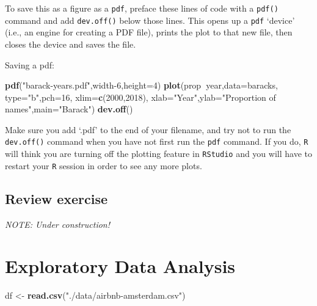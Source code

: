 \documentclass[
]{book}
\newenvironment{Shaded}{\begin{snugshade}}{\end{snugshade}}
\newcommand{\DataTypeTok}[1]{\textcolor[rgb]{0.13,0.29,0.53}{#1}}
\newcommand{\DecValTok}[1]{\textcolor[rgb]{0.00,0.00,0.81}{#1}}
\newcommand{\KeywordTok}[1]{\textcolor[rgb]{0.13,0.29,0.53}{\textbf{#1}}}
\newcommand{\NormalTok}[1]{#1}
\newcommand{\OperatorTok}[1]{\textcolor[rgb]{0.81,0.36,0.00}{\textbf{#1}}}
\newcommand{\StringTok}[1]{\textcolor[rgb]{0.31,0.60,0.02}{#1}}
\begin{document}
To save this as a figure as a \texttt{pdf}, preface these lines of code with a \texttt{pdf()} command and add \texttt{dev.off()} below those lines. This opens up a \texttt{pdf} `device' (i.e., an engine for creating a PDF file), prints the plot to that new file, then closes the device and saves the file.

Saving a pdf:

\begin{Shaded}
\begin{Highlighting}[]
\KeywordTok{pdf}\NormalTok{(}\StringTok{"barack-years.pdf"}\NormalTok{,width}\DecValTok{-6}\NormalTok{,}\DataTypeTok{height=}\DecValTok{4}\NormalTok{)}
\KeywordTok{plot}\NormalTok{(prop}\OperatorTok{~}\NormalTok{year,}\DataTypeTok{data=}\NormalTok{baracks,}
     \DataTypeTok{type=}\StringTok{"b"}\NormalTok{,}\DataTypeTok{pch=}\DecValTok{16}\NormalTok{,}
     \DataTypeTok{xlim=}\KeywordTok{c}\NormalTok{(}\DecValTok{2000}\NormalTok{,}\DecValTok{2018}\NormalTok{),}
     \DataTypeTok{xlab=}\StringTok{"Year"}\NormalTok{,}\DataTypeTok{ylab=}\StringTok{"Proportion of names"}\NormalTok{,}\DataTypeTok{main=}\StringTok{"Barack"}\NormalTok{)}
\KeywordTok{dev.off}\NormalTok{()}
\end{Highlighting}
\end{Shaded}

Make sure you add `.pdf' to the end of your filename, and try not to run the \texttt{dev.off()} command when you have not first run the \texttt{pdf} command. If you do, \texttt{R} will think you are turning off the plotting feature in \texttt{RStudio} and you will have to restart your \texttt{R} session in order to see any more plots.

\hypertarget{review-exercise-2}{%
\section*{Review exercise}\label{review-exercise-2}}

\emph{NOTE: Under construction!}

\hypertarget{exploratory-data-analysis}{%
\chapter{Exploratory Data Analysis}\label{exploratory-data-analysis}}

\begin{Shaded}
\begin{Highlighting}[]
\NormalTok{df <-}\StringTok{ }\KeywordTok{read.csv}\NormalTok{(}\StringTok{"./data/airbnb-amsterdam.csv"}\NormalTok{)}
\end{Highlighting}
\end{Shaded}
\end{document}
